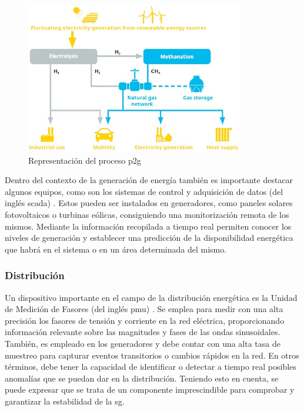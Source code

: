 \begin{figure}[h!]
  \centering
  \includegraphics[width=0.85\textwidth]{img/teoria/p2g.jpg}
  \caption{Representación del proceso \acrshort{p2g} \cite{p2g}}
  \label{fig:p2g}
\end{figure}

\vspace{3mm}
\pagebreak

Dentro del contexto de la generación de energía también es importante destacar algunos equipos, como son los sistemas de control y adquisición de datos (del inglés \gls{scada}) \cite{scada}. Estos pueden ser instalados en generadores, como paneles solares fotovoltaicos o turbinas eólicas, consiguiendo una monitorización remota de los mismos. Mediante la información recopilada a tiempo real permiten conocer los niveles de generación y establecer una predicción de la disponibilidad energética que habrá en el sistema o en un área determinada del mismo.

\vspace{3mm}

\subsubsection{Distribución}

Un dispositivo importante en el campo de la distribución energética es la Unidad de Medición de Fasores (del inglés \gls{pmu}) \cite{dynamic}. Se emplea para medir con una alta precisión los fasores de tensión y corriente en la red eléctrica, proporcionando información relevante sobre las magnitudes y fases de las ondas sinusoidales. También, es empleado en los generadores y debe contar con una alta tasa de muestreo para capturar eventos transitorios o cambios rápidos en la red. En otros términos, debe tener la capacidad de identificar o detectar a tiempo real posibles anomalías que se puedan dar en la distribución. Teniendo esto en cuenta, se puede expresar que se trata de un componente imprescindible para comprobar y garantizar la estabilidad de la \gls{sg}. 

